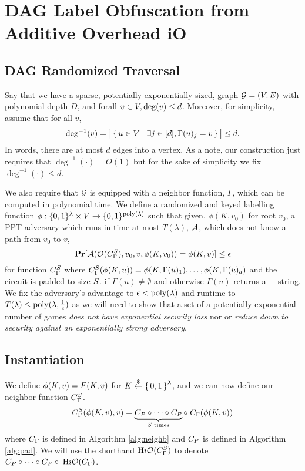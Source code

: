 \section{DAG Label Obfuscation from Additive Overhead iO}
\subsection{DAG Randomized Traversal}
Say that we have a sparse, potentially exponentially sized, graph $\mathcal{G} = (V, E)$ with polynomial depth $D$,
and forall $v \in V, \deg(v) \leq d$. Moreover, for simplicity,
assume that for all $v$, 
$$
\deg^{-1}(v) = \big|\set{u \in V \mid \exists j \in [d], \Gamma(u)_j = v}\big| \leq d.
$$
In words, there are at most $d$ edges into a vertex. As a note, our construction just requires
that $\deg^{-1}(\cdot) = O(1)$ but for the sake of simplicity we fix $\deg^{-1}(\cdot) \leq d$.

We also require that $\mathcal{G}$ is equipped with a neighbor function, $\Gamma$, which can be computed in polynomial time.
We define a randomized and keyed labelling function $\phi: \{0,1\}^\lambda \times V \rightarrow \{0,1\}^{\operatorname{poly}(\lambda)}$ 
such that given, $\phi(K, v_0)$ for root $v_0$, a PPT adversary which runs in time at most $T(\lambda)$, $\mathcal{A}$, which does not know a path from $v_0$ to $v$,
\begin{equation}
	\label{eq:guessPhi}
	\operatorname*{\mathbf{Pr}}[\mathcal{A}(\mathcal{O}({C_\Gamma^S}), v_0, v, \phi(K, v_0)) = \phi(K, v)] \leq \epsilon
\end{equation}
for function ${C_\Gamma^S}$ where ${C_\Gamma^S}(\phi(K, u)) = \phi(K, \Gamma(u)_1), \dots, \phi(K, \Gamma(u)_d)$ and the circuit is padded to size $S$.
if $\Gamma(u) \neq \emptyset$ and otherwise $\Gamma(u)$ returns a $\bot$ string.
We fix the adversary's advantage to $\epsilon < \operatorname{poly}(\lambda)$ and runtime to $T(\lambda) \leq \operatorname{poly}(\lambda, \frac{1}{\epsilon})$
as we will need to show
that a set of a potentially exponential number of games \emph{does not have exponential security loss}
nor or \emph{reduce down to security against an exponentially strong adversary}.

\subsection{Instantiation}
We define 
$
	\phi(K, v) = F(K, v)
$ for $K \overset{\$}{\gets} \set{0, 1}^\lambda$, and we can now define our neighbor function ${C_\Gamma^S}$.
\begin{equation}
	\label{eq:neighbfn}
	{C_\Gamma^S}(\phi(K, v), v) = \underbrace{{C_P} \circ\cdots \circ {C_P}}_{S\text{ times}} \circ \; C_\Gamma(\phi(K, v))
\end{equation}
where $C_\Gamma$ is defined in Algorithm \ref{alg:neighb} and ${C_P}$ is defined in Algorithm \ref{alg:pad}.
We will use the shorthand $\text{H}i\mathcal{O}({C_\Gamma^S})$ to denote 
$ {C_P} \circ \cdots \circ {C_P} \circ \; \text{H}i\mathcal{O}(C_\Gamma)$.

